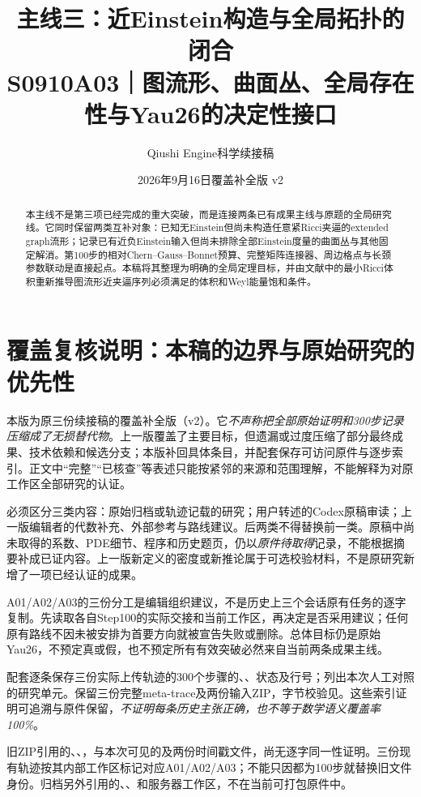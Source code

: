 \documentclass[UTF8,a4paper,11pt,fontset=fandol]{ctexart}
\title{主线三：近Einstein构造与全局拓扑的闭合\\[0.5em]{\large S0910A03｜图流形、曲面丛、全局存在性与Yau26的决定性接口}}
\author{Qiushi Engine\quad 科学续接稿}
\date{2026年9月16日\quad 覆盖补全版 v2}
\numberwithin{equation}{section}
\theoremstyle{definition}
\begin{document}
\maketitle
\begin{abstract}
本主线不是第三项已经完成的重大突破，而是连接两条已有成果主线与原题的全局研究线。它同时保留两类互补对象：已知无Einstein但尚未构造任意紧Ricci夹逼的extended graph流形；记录已有近负Einstein输入但尚未排除全部Einstein度量的曲面丛与其他固定解消。第100步的相对Chern--Gauss--Bonnet预算、完整矩阵连接器、周边格点与长颈参数联动是直接起点。本稿将其整理为明确的全局定理目标，并由文献中的最小Ricci体积重新推导图流形近夹逼序列必须满足的体积和Weyl能量饱和条件。
\end{abstract}
\begingroup
\small\linespread{1.0}\selectfont\setlength{\parskip}{0pt}
\tableofcontents
\endgroup
\clearpage

\section*{覆盖复核说明：本稿的边界与原始研究的优先性}
本版为原三份续接稿的覆盖补全版（v2）。它\emph{不声称把全部原始证明和300步记录压缩成了无损替代物}。上一版覆盖了主要目标，但遗漏或过度压缩了部分最终成果、技术依赖和候选分支；本版补回具体条目，并配套保存可访问原件与逐步索引。正文中“完整”“已核查”等表述只能按紧邻的来源和范围理解，不能解释为对原工作区全部研究的认证。

必须区分三类内容：原始归档或轨迹记载的研究；用户转述的Codex原稿审读；上一版编辑者的代数补充、外部参考与路线建议。后两类不得替换前一类。原稿中尚未取得的系数、PDE细节、程序和历史题页，仍以\emph{原件待取得}记录，不能根据摘要补成已证内容。上一版新定义的密度或新推论属于可选校验材料，不是原研究新增了一项已经认证的成果。

A01/A02/A03的三份分工是编辑组织建议，不是历史上三个会话原有任务的逐字复制。先读取各自Step100的实际交接和当前工作区，再决定是否采用建议；任何原有路线不因未被安排为首要方向就被宣告失败或删除。总体目标仍是原始Yau26，不预定真或假，也不预定所有有效突破必然来自当前两条成果主线。

配套逐条保存三份实际上传轨迹的300个步骤的、、状态及行号；列出本次人工对照的研究单元。保留三份完整meta-trace及两份输入ZIP，字节校验见。这些索引证明可追溯与原件保留，\emph{不证明每条历史主张正确，也不等于数学语义覆盖率100\%}。

旧ZIP引用的、、，与本次可见的及两份时间戳文件，尚无逐字同一性证明。三份现有轨迹按其内部工作区标记对应A01/A02/A03；不能只因都为100步就替换旧文件身份。归档另外引用的、、和服务器工作区，不在当前可打包原件中。
\end{document}
